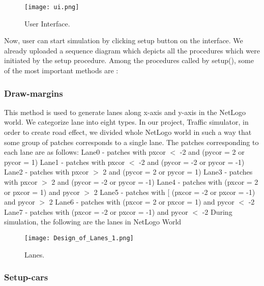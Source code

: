 \documentclass[11pt,a4paper]{article}
\begin{document}
\begin{figure}[!ht]
\centering
\texttt{[image: ui.png]}
\caption{\label{fig:ui}User Interface.}
\end{figure}
                                    
Now, user can start simulation by clicking setup button on the interface. We already uploaded a sequence diagram which depicts all the procedures which were initiated by the setup procedure.\newline
Among the procedures called by setup(), some of the most important methods are :

\subsubsection{\textbf{Draw-margins}}

This method is used to generate lanes along x-axis and y-axis in the NetLogo world. We categorize lane into eight types. In our project, Traffic simulator, in order to create road effect, we divided whole NetLogo world in such a way that some group of patches corresponds to a single lane. The patches corresponding to each lane are as follows: \newline
Lane0 - patches with  pxcor \(<\) -2 and (pycor = 2  or pycor = 1)\newline
Lane1 - patches with  pxcor \(<\) -2 and (pycor = -2 or pycor = -1)\newline
Lane2 - patches with pxcor \(>\) 2  and (pycor = 2  or pycor = 1)\newline
Lane3 - patches with pxcor \(>\) 2  and (pycor = -2 or pycor = -1)\newline
Lane4 - patches with (pxcor = 2  or pxcor = 1)  and pycor \(>\) 2\newline
Lane5 - patches with [ (pxcor = -2 or pxcor = -1) and pycor \(>\) 2\newline
Lane6 - patches with (pxcor = 2  or pxcor  = 1) and pycor \(<\) -2\newline
Lane7 - patches with (pxcor = -2 or pxcor = -1) and pycor \(<\) -2\newline
During simulation, the following are the lanes in NetLogo World

\begin{figure}[!ht]
\centering
\texttt{[image: Design\_of\_Lanes\_1.png]}
\caption{\label{fig:dol1}Lanes.}
\end{figure}

\subsubsection{\textbf{Setup-cars}}
\end{document}
